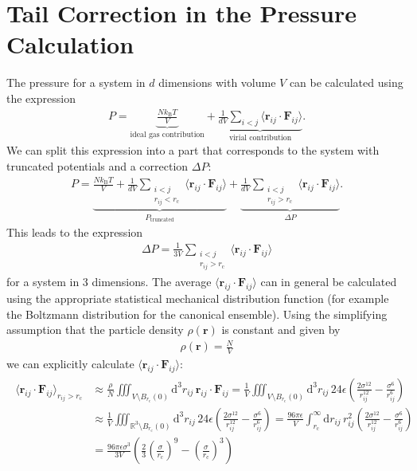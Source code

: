 \documentclass[a4paper,10pt,bibtotoc]{scrartcl}
\begin{document}
\newpage
\section{Tail Correction in the Pressure Calculation}
The pressure for a system in $d$ dimensions with volume $V$ can be calculated using the expression
\begin{align}
P = \underbrace{\frac{Nk_\mathrm{B}T}{V}}_{\text{ideal gas contribution}} + \underbrace{\frac{1}{dV}\sum_{i<j}\langle\mathbf{r}_{ij}\cdot\mathbf{F}_{ij}\rangle}_{\text{virial contribution}}.
\end{align}
We can split this expression into a part that corresponds to the system with truncated potentials and a correction $\Delta P$:
\begin{align}
P = \underbrace{\frac{Nk_\mathrm{B}T}{V} + \frac{1}{dV}\sum_{\substack{i<j\\ r_{ij}<r_\mathrm{c}}}\langle\mathbf{r}_{ij}\cdot\mathbf{F}_{ij}\rangle}_{P_\text{truncated}} + \underbrace{\frac{1}{dV}\sum_{\substack{i<j\\ r_{ij}>r_\mathrm{c}}}\langle\mathbf{r}_{ij}\cdot\mathbf{F}_{ij}\rangle}_{\Delta P}.
\end{align}
This leads to the expression
\begin{align}
\Delta P = \frac{1}{3V}\sum_{\substack{i<j\\ r_{ij}>r_\mathrm{c}}}\langle\mathbf{r}_{ij}\cdot\mathbf{F}_{ij}\rangle
\end{align}
for a system in 3 dimensions. The average $\langle\mathbf{r}_{ij}\cdot\mathbf{F}_{ij}\rangle$ can in general be calculated using the appropriate statistical mechanical distribution function (for example the Boltzmann distribution for the canonical ensemble). Using the simplifying assumption that the particle density $\rho\left(\mathbf{r}\right)$ is constant and given by 
\begin{align}
\rho\left(\mathbf{r}\right) = \frac{N}{V}
\end{align}
we can explicitly calculate $\langle\mathbf{r}_{ij}\cdot\mathbf{F}_{ij}\rangle$:
\begin{align}
\begin{split}
\langle\mathbf{r}_{ij}\cdot\mathbf{F}_{ij}\rangle_{r_{ij}>r_\mathrm{c}} &\approx \frac{\rho}{N}\iiint_{V\setminus B_{r_\mathrm{c}}(0)}\mathrm{d}^3r_{ij}\,\mathbf{r}_{ij}\cdot\mathbf{F}_{ij}= \frac{1}{V}\iiint_{V\setminus B_{r_\mathrm{c}}(0)}\mathrm{d}^3r_{ij}\,24\epsilon\left(\frac{2\sigma^{12}}{r_{ij}^{12}}-\frac{\sigma^6}{r_{ij}^6}\right)\\ &
\approx \frac{1}{V}\iiint_{\mathbb{R}^3\setminus B_{r_\mathrm{c}}(0)}\mathrm{d}^3r_{ij}\,24\epsilon\left(\frac{2\sigma^{12}}{r_{ij}^{12}}-\frac{\sigma^6}{r_{ij}^6}\right)= \frac{96\pi\epsilon}{V}\int_{r_\mathrm{c}}^{\infty}\mathrm{d}r_{ij}\,r_{ij}^2\left(\frac{2\sigma^{12}}{r_{ij}^{12}}-\frac{\sigma^6}{r_{ij}^6}\right)\\ &= \frac{96\pi\epsilon\sigma^3}{3V}\left(\frac{2}{3}\left(\frac{\sigma}{r_\mathrm{c}}\right)^9-\left(\frac{\sigma}{r_\mathrm{c}}\right)^3\right)
\end{split}
\end{align}
\end{document}
